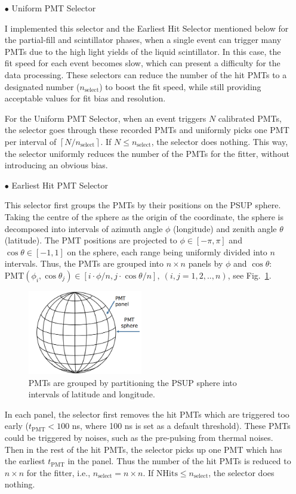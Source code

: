 \begin{itemize}
	\item[$\bullet$] Uniform PMT Selector
	
	I implemented this selector and the Earliest Hit Selector mentioned below for the partial-fill and scintillator phases, when a single event can trigger many PMTs due to the high light yields of the liquid scintillator. In this case, the fit speed for each event becomes slow, which can present a difficulty for the data processing. These selectors can reduce the number of the hit PMTs to a designated number ($n_\mathrm{select}$) to boost the fit speed, while still providing acceptable values for fit bias and resolution. 
	
	For the Uniform PMT Selector, when an event triggers $N$ calibrated PMTs, the selector goes through these recorded PMTs and uniformly picks one PMT per interval of $\left \lceil{N/n_\mathrm{select}}\right \rceil $. If $N\leq n_\mathrm{select}$, the selector does nothing. This way, the selector uniformly reduces the number of the PMTs for the fitter, without introducing an obvious bias.
	
	\item[$\bullet$] Earliest Hit PMT Selector
	
	This selector first groups the PMTs by their positions on the PSUP sphere. Taking the centre of the sphere as the origin of the coordinate, the sphere is decomposed into intervals of azimuth angle $\phi$ (longitude) and zenith angle $\theta$ (latitude). The PMT positions are projected to $\phi\in [-\pi,\pi]$ and $\cos\theta\in [-1, 1]$ on the sphere, each range being uniformly divided into $n$ intervals. Thus, the PMTs are grouped into $n\times n$ panels by $\phi$ and $\cos\theta$: $\mathrm{PMT}(\phi_i,\cos\theta_j) \in [i\cdot\phi/n, j\cdot\cos\theta/n],~(i,j=1,2,..,n)$, see Fig.~\ref{GroupPMTs}.
	\begin{figure}[!htb]
		\centering
		\includegraphics[width=5cm]{GroupPMTs.png}
		\caption{PMTs are grouped by partitioning the PSUP sphere into intervals of latitude and longitude.}
		\label{GroupPMTs}
	\end{figure}
	
	In each panel, the selector first removes the hit PMTs which are triggered too early ($t_\mathrm{PMT}<100$ ns, where 100 ns is set as a default threshold). These PMTs could be triggered by noises, such as the pre-pulsing from thermal noises. Then in the rest of the hit PMTs, the selector picks up one PMT which has the earliest $t_\mathrm{PMT}$ in the panel. Thus the number of the hit PMTs is reduced to $n\times n$ for the fitter, i.e., $n_\mathrm{select}=n\times n$. If $\mathrm{NHits}\leq n_\mathrm{select}$, the selector does nothing. 
	

\end{itemize}
